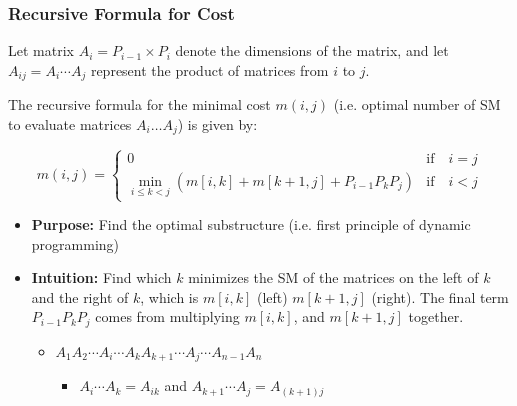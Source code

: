 \subsubsection{Recursive Formula for Cost}
\begin{definition}
    Let matrix \(A_i = P_{i-1} \times P_i\) denote the dimensions of the matrix, and let \(A_{ij} = A_i \cdots A_j\) represent the product of matrices from \(i\) to \(j\).
    \vspace{1em}

    The recursive formula for the minimal cost \(m(i,j)\) (i.e. optimal number of SM to evaluate matrices \(A_i \dots A_j\)) is given by:

    \begin{equation*}
    m(i,j) = 
    \begin{cases}
    0 & \text{if} \quad i = j \\
    \min_{i \leq k < j} \left( m[i,k] + m[k+1,j] + P_{i-1} P_k P_j \right) & \text{if} \quad i < j
    \end{cases}
    \end{equation*}
    \begin{itemize}
        \item \textbf{Purpose:} Find the optimal substructure (i.e. first principle of dynamic programming)
        \item \textbf{Intuition:} Find which $k$ minimizes the SM of the matrices on the left of $k$ and the right of $k$, which is $m[i,k]$ (left) $m[k+1,j]$ (right). The final term \(P_{i-1} P_k P_j\) comes from multiplying $m[i,k]$, and $m[k+1,j]$ together. 
        \begin{itemize}
            \item $A_1 A_2 \cdots A_i \cdots A_k A_{k+1} \cdots A_j \cdots A_{n-1} A_n$
            \begin{itemize}
            \item $A_i \cdots A_k = A_{ik}$ and $A_{k+1} \cdots A_j = A_{(k+1)j}$
            \end{itemize}
        \end{itemize} 
    \end{itemize}
\end{definition}

